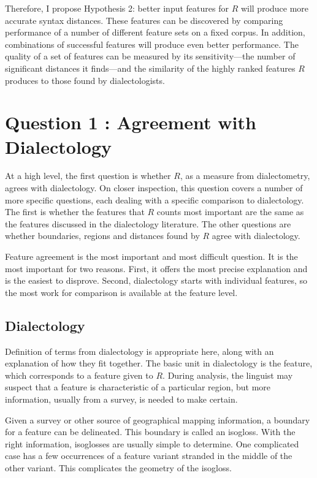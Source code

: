 Therefore, I propose Hypothesis 2: better input features
for $R$ will produce more accurate syntax
distances. These features can be discovered by comparing performance
of a number of different feature sets on a fixed corpus. In addition,
combinations of successful features will produce even better
performance.
The quality of a set of features can be
measured by its sensitivity---the number of significant distances it
finds---and the similarity of the highly ranked features $R$ produces
to those found by dialectologists.

\section{Question 1 : Agreement with Dialectology}

At a high level, the first question is whether $R$, as a measure from
dialectometry, agrees with dialectology. On closer inspection, this
question covers a number of more specific questions, each dealing with
a specific comparison to dialectology. The first is whether the
features that $R$ counts most important are the same as the features
discussed in the dialectology literature. The other questions are
whether boundaries, regions and distances found by $R$ agree with
dialectology.

Feature agreement is the most important and most difficult
question. It is the most important for two reasons. First, it offers
the most precise explanation and is the easiest to disprove. Second,
dialectology starts with individual features, so the most work for
comparison is available at the feature level.

\subsection{Dialectology}

Definition of terms from dialectology is appropriate here, along with
an explanation of how they fit together. The basic unit in
dialectology is the feature, which corresponds to a feature given to
$R$. During analysis, the linguist may suspect that a feature is
characteristic of a particular region, but more information, usually
from a survey, is needed to make certain.

Given a survey or other source of geographical mapping information, a
boundary for a feature can be delineated. This boundary is called an
isogloss. With the right information, isoglosses are usually simple to
determine. One complicated case has a few occurrences of a feature
variant stranded in the middle of the other variant. This complicates
the geometry of the isogloss.

